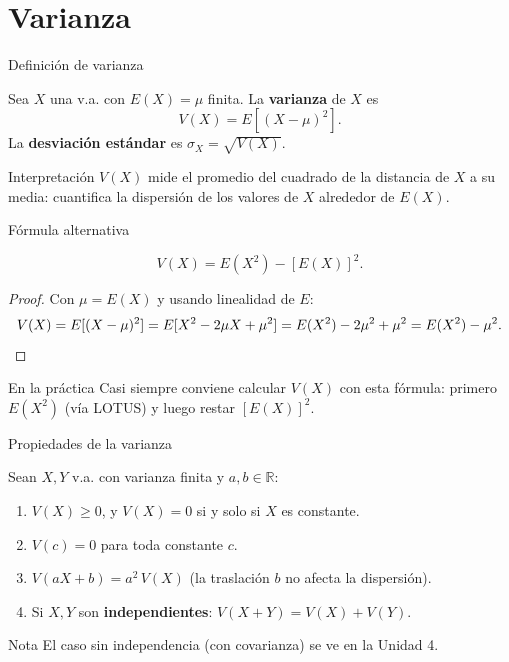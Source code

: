 \documentclass[aspectratio=169,11pt]{beamer}
\begin{document}
\section{Varianza}

\begin{frame}{Definición de varianza}
\begin{definition}[Varianza]
Sea $X$ una v.a. con $E(X)=\mu$ finita. La \textbf{varianza} de $X$ es
\[
V(X) = E\left[(X-\mu)^2\right].
\]
La \textbf{desviación estándar} es $\sigma_X = \sqrt{V(X)}$.
\end{definition}

\begin{block}{Interpretación}
$V(X)$ mide el promedio del cuadrado de la distancia de $X$ a su media: cuantifica la dispersión de los valores de $X$ alrededor de $E(X)$.
\end{block}
\end{frame}

\begin{frame}{Fórmula alternativa}
\begin{theorem}
\[
V(X) = E(X^2) - [E(X)]^2.
\]
\end{theorem}

\begin{proof}
Con $\mu=E(X)$ y usando linealidad de $E$:
\[
V(X) = E[(X-\mu)^2] = E[X^2 - 2\mu X + \mu^2] = E(X^2) - 2\mu^2+\mu^2 = E(X^2)-\mu^2. \qedhere
\]
\end{proof}

\begin{alertblock}{En la práctica}
Casi siempre conviene calcular $V(X)$ con esta fórmula: primero $E(X^2)$ (vía LOTUS) y luego restar $[E(X)]^2$.
\end{alertblock}
\end{frame}

\begin{frame}{Propiedades de la varianza}
\begin{theorem}[Propiedades]
Sean $X,Y$ v.a. con varianza finita y $a,b\in\mathbb{R}$:
\begin{enumerate}
\item $V(X)\ge 0$, y $V(X)=0$ si y solo si $X$ es constante.
\item $V(c) = 0$ para toda constante $c$.
\item $V(aX+b) = a^2\,V(X)$ (la traslación $b$ no afecta la dispersión).
\item Si $X,Y$ son \textbf{independientes}: $V(X+Y) = V(X)+V(Y)$.
\end{enumerate}
\end{theorem}

\begin{alertblock}{Nota}
El caso sin independencia (con covarianza) se ve en la Unidad 4.
\end{alertblock}
\end{frame}
\end{document}
